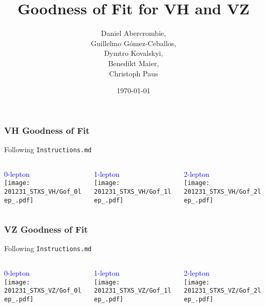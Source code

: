 \documentclass{beamer}
\author[D. Abercrombie]{
  Daniel Abercrombie, \\
  Guillelmo G\'omez-Ceballos, \\
  Dymtro Kovalskyi, \\
  Benedikt Maier, \\
  Christoph Paus
}
\title{\bf \sffamily Goodness of Fit for VH and VZ}
\date{\today}
\begin{document}
\begin{frame}
  \titlepage
\end{frame}

\begin{frame}
  \frametitle{VH Goodness of Fit}

  Following \texttt{Instructions.md}

  \begin{columns}
    \begin{column}{0.3\linewidth}
      \centering
      \textcolor{blue}{0-lepton} \\
      \texttt{[image: 201231\_STXS\_VH/Gof\_0lep\_.pdf]}
    \end{column}
    \begin{column}{0.3\linewidth}
      \centering
      \textcolor{blue}{1-lepton} \\
      \texttt{[image: 201231\_STXS\_VH/Gof\_1lep\_.pdf]}
    \end{column}
    \begin{column}{0.3\linewidth}
      \centering
      \textcolor{blue}{2-lepton} \\
      \texttt{[image: 201231\_STXS\_VH/Gof\_2lep\_.pdf]}
    \end{column}
  \end{columns}

\end{frame}

\begin{frame}
  \frametitle{VZ Goodness of Fit}

  Following \texttt{Instructions.md}

  \begin{columns}
    \begin{column}{0.3\linewidth}
      \centering
      \textcolor{blue}{0-lepton} \\
      \texttt{[image: 201231\_STXS\_VZ/Gof\_0lep\_.pdf]}
    \end{column}
    \begin{column}{0.3\linewidth}
      \centering
      \textcolor{blue}{1-lepton} \\
      \texttt{[image: 201231\_STXS\_VZ/Gof\_1lep\_.pdf]}
    \end{column}
    \begin{column}{0.3\linewidth}
      \centering
      \textcolor{blue}{2-lepton} \\
      \texttt{[image: 201231\_STXS\_VZ/Gof\_2lep\_.pdf]}
    \end{column}
  \end{columns}

\end{frame}
\end{document}

